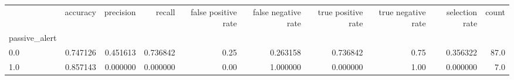 \begin{tabular}{lrrrrrrrrr}
\toprule
{} &  accuracy &  precision &    recall &  false positive rate &  false negative rate &  true positive rate &  true negative rate &  selection rate &  count \\
passive\_alert &           &            &           &                      &                      &                     &                     &                 &        \\
\midrule
0.0           &  0.747126 &   0.451613 &  0.736842 &                 0.25 &             0.263158 &            0.736842 &                0.75 &        0.356322 &   87.0 \\
1.0           &  0.857143 &   0.000000 &  0.000000 &                 0.00 &             1.000000 &            0.000000 &                1.00 &        0.000000 &    7.0 \\
\bottomrule
\end{tabular}
